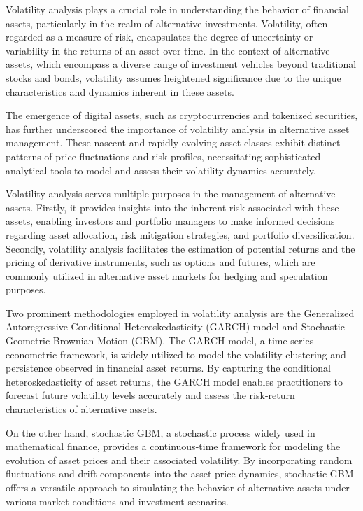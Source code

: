 \documentclass{ledger}
\begin{document}
Volatility analysis plays a crucial role in understanding the behavior of financial assets, particularly in the realm of alternative investments. Volatility, often regarded as a measure of risk, encapsulates the degree of uncertainty or variability in the returns of an asset over time. In the context of alternative assets, which encompass a diverse range of investment vehicles beyond traditional stocks and bonds, volatility assumes heightened significance due to the unique characteristics and dynamics inherent in these assets.

The emergence of digital assets, such as cryptocurrencies and tokenized securities, has further underscored the importance of volatility analysis in alternative asset management. These nascent and rapidly evolving asset classes exhibit distinct patterns of price fluctuations and risk profiles, necessitating sophisticated analytical tools to model and assess their volatility dynamics accurately.

Volatility analysis serves multiple purposes in the management of alternative assets. Firstly, it provides insights into the inherent risk associated with these assets, enabling investors and portfolio managers to make informed decisions regarding asset allocation, risk mitigation strategies, and portfolio diversification. Secondly, volatility analysis facilitates the estimation of potential returns and the pricing of derivative instruments, such as options and futures, which are commonly utilized in alternative asset markets for hedging and speculation purposes.

Two prominent methodologies employed in volatility analysis are the Generalized Autoregressive Conditional Heteroskedasticity (GARCH) model and Stochastic Geometric Brownian Motion (GBM). The GARCH model, a time-series econometric framework, is widely utilized to model the volatility clustering and persistence observed in financial asset returns. By capturing the conditional heteroskedasticity of asset returns, the GARCH model enables practitioners to forecast future volatility levels accurately and assess the risk-return characteristics of alternative assets.

On the other hand, stochastic GBM, a stochastic process widely used in mathematical finance, provides a continuous-time framework for modeling the evolution of asset prices and their associated volatility. By incorporating random fluctuations and drift components into the asset price dynamics, stochastic GBM offers a versatile approach to simulating the behavior of alternative assets under various market conditions and investment scenarios.
\end{document}
